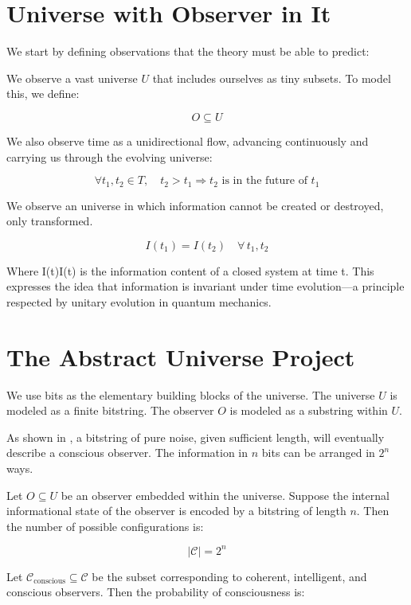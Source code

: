 \documentclass[11pt]{article}
\begin{document}



\section{Universe with Observer in It}

We start by defining observations that the theory must be able to predict:

We observe a vast universe \( U \) that includes ourselves as tiny subsets. To model this, we define:

\[
      O \subseteq U
\]

We also observe time as a unidirectional flow, advancing continuously and carrying us through the evolving universe:

\[
      \forall t_1, t_2 \in T,\quad t_2 > t_1 \Rightarrow t_2 \text{ is in the future of } t_1
\]

We observe an universe in which information cannot be created or destroyed, only transformed.

\[
      I(t_1) = I(t_2) \quad \forall \, t_1, t_2
\]

Where I(t)I(t) is the information content of a closed system at time t. This expresses the idea that information is invariant under time evolution—a principle respected by unitary evolution in quantum mechanics.





\section{The Abstract Universe Project}

We use bits as the elementary building blocks of the universe. The universe \(U\) is modeled as a finite bitstring. The observer \(O\) is modeled as a substring within \(U\).

As shown in \cite{meskanen2019}, a bitstring of pure noise, given sufficient length, will eventually describe a conscious observer. The information in \(n\) bits can be arranged in \(2^n\) ways.

Let \(O \subseteq U\) be an observer embedded within the universe. Suppose the internal informational state of the observer is encoded by a bitstring of length \(n\). Then the number of possible configurations is:

\[
      |\mathcal{C}| = 2^n
\]

Let \(\mathcal{C}_{\text{conscious}} \subseteq \mathcal{C}\) be the subset corresponding to coherent, intelligent, and conscious observers. Then the probability of consciousness is:
\end{document}
